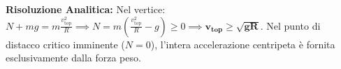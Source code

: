 \textbf{Risoluzione Analitica:}
Nel vertice: $N + mg = m\frac{v_{\text{top}}^2}{R} \implies N = m\left(\frac{v_{\text{top}}^2}{R} - g\right) \ge 0 \implies \mathbf{v_{\text{top}} \ge \sqrt{g R}}$.
Nel punto di distacco critico imminente ($N = 0$), l'intera accelerazione centripeta è fornita esclusivamente dalla forza peso.
